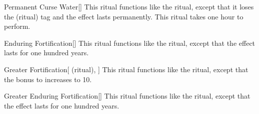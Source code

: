 \lowercase{\hypertarget{spell:Permanent Curse Water}{}}\label{spell:Permanent Curse Water}
\begin{apability}[Rank 3]{\hypertarget{spell:Permanent Curse Water}{Permanent Curse Water}}[]
This ritual functions like the  ritual, except that it loses the  (ritual) tag and the effect lasts permanently.
This ritual takes one hour to perform.
\end{apability}
\vspace{0.25em}



\lowercase{\hypertarget{spell:Enduring Fortification}{}}\label{spell:Enduring Fortification}
\begin{apability}[Rank 4]{\hypertarget{spell:Enduring Fortification}{Enduring Fortification}}[]
This ritual functions like the  ritual, except that the effect lasts for one hundred years.
\end{apability}
\vspace{0.25em}



\lowercase{\hypertarget{spell:Greater Fortification}{}}\label{spell:Greater Fortification}
\begin{attuneability}[Rank 4]{\hypertarget{spell:Greater Fortification}{Greater Fortification}}[ (ritual), ]
This ritual functions like the  ritual, except that the bonus to  increases to 10.
\end{attuneability}
\vspace{0.25em}



\lowercase{\hypertarget{spell:Greater Enduring Fortification}{}}\label{spell:Greater Enduring Fortification}
\begin{apability}[Rank 5]{\hypertarget{spell:Greater Enduring Fortification}{Greater Enduring Fortification}}[]
This ritual functions like the  ritual, except that the effect lasts for one hundred years.
\end{apability}
\vspace{0.25em}



